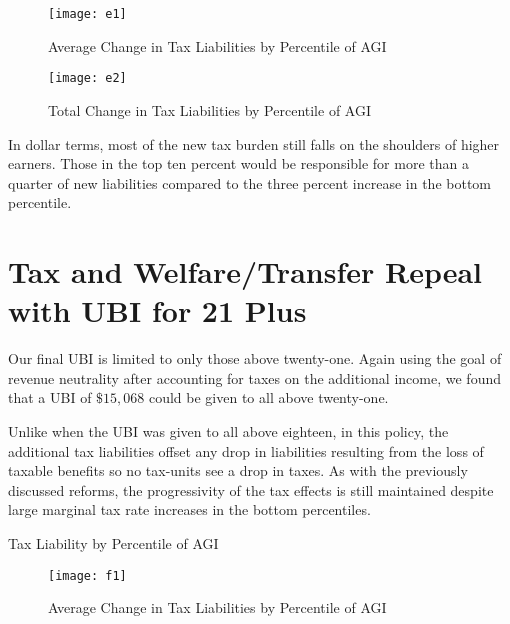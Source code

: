 \documentclass{article}
\begin{document}
\begin{figure}[H]
\centering
\caption{Average Change in Tax Liabilities by Percentile of AGI}
\texttt{[image: e1]}
\end{figure}

\begin{figure}[H]
\centering
\caption{Total Change in Tax Liabilities by Percentile of AGI}
\texttt{[image: e2]}
\end{figure}

In dollar terms, most of the new tax burden still falls on the shoulders of higher earners. Those in the top ten percent would be responsible for more than a quarter of new liabilities compared to the three percent increase in the bottom percentile.

\section{Tax and Welfare/Transfer Repeal with UBI for 21 Plus}
Our final UBI is limited to only those above twenty-one. Again using the goal of revenue neutrality after accounting for taxes on the additional income, we found that a UBI of $\$15,068$ could be given to all above twenty-one. 

Unlike when the UBI was given to all above eighteen, in this policy, the additional tax liabilities offset any drop in liabilities resulting from the loss of taxable benefits so no tax-units see a drop in taxes. As with the previously discussed reforms, the progressivity of the tax effects is still maintained despite large marginal tax rate increases in the bottom percentiles.

\begin{table}[H]
\caption{Tax Liability by Percentile of AGI}

\begin{center}
\begin{adjustbox}{max width=\textwidth}

\end{adjustbox}
\end{center}
\end{table}

\begin{figure}[H]
\centering
\caption{Average Change in Tax Liabilities by Percentile of AGI}
\texttt{[image: f1]}
\end{figure}
\end{document}
